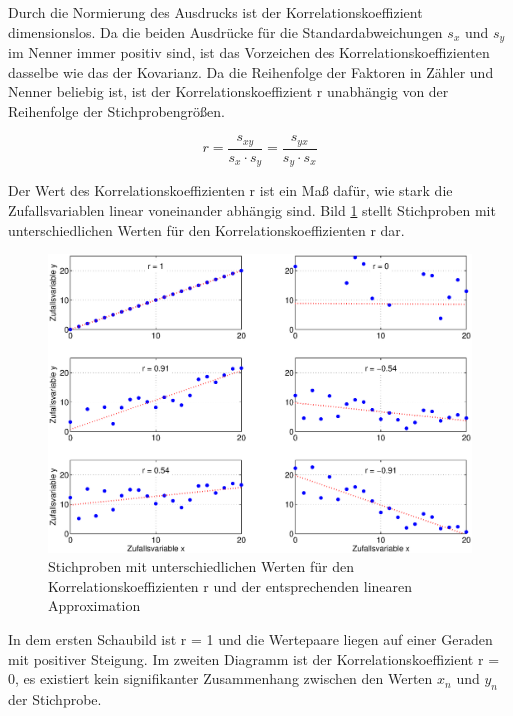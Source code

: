 \noindent Durch die Normierung des Ausdrucks ist der Korrelationskoeffizient dimensionslos. Da die beiden Ausdr\"{u}cke f\"{u}r die Standardabweichungen $s_{x}$ und $s_{y}$ im Nenner immer positiv sind, ist das Vorzeichen des Korrelationskoeffizienten dasselbe wie das der Kovarianz. Da die Reihenfolge der Faktoren in Z\"{a}hler und Nenner beliebig ist, ist der Korrelationskoeffizient r unabh\"{a}ngig von der Reihenfolge der Stichprobengr\"{o}{\ss}en. 

\begin{equation}\label{eq:tentwo}
r=\dfrac{s_{xy}}{s_{x} \cdot s_{y}} =\dfrac{s_{yx}}{s_{y} \cdot s_{x}}
\end{equation}

\noindent Der Wert des Korrelationskoeffizienten r ist ein Ma{\ss} daf\"{u}r, wie stark die Zufallsvariablen linear voneinander abh\"{a}ngig sind. Bild \ref{fig:Korrelation1} stellt Stichproben mit unterschiedlichen Werten f\"{u}r den Korrelationskoeffizienten r dar.

\clearpage

\noindent 
\begin{figure}[H]
  \centerline{\includegraphics[width=1\textwidth]{Kapitel10/Bilder/image1}}
  \caption{Stichproben mit unterschiedlichen Werten f\"{u}r den Korrelationskoeffizienten r und der entsprechenden linearen Approximation}
  \label{fig:Korrelation1}
\end{figure}

\noindent In dem ersten Schaubild ist r = 1 und die Wertepaare liegen auf einer Geraden mit positiver Steigung. Im zweiten Diagramm ist der Korrelationskoeffizient r = 0, es existiert kein signifikanter Zusammenhang zwischen den Werten $x_{n}$ und $y_{n}$ der Stichprobe.\newline

